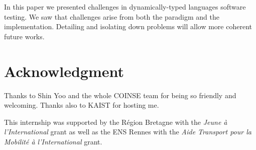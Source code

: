 \documentclass{llncs2e/llncs}
\begin{document}
In this paper we presented challenges in dynamically-typed languages software
testing. We saw that challenges arise from both the paradigm and the
implementation. Detailing and isolating down problems will allow more coherent
future works.


\section*{Acknowledgment}
Thanks to Shin Yoo and the whole COINSE team for being so friendly and
welcoming. Thanks also to KAIST for hosting me.

This internship was supported by the R\'egion Bretagne with the \textit{Jeune
\`a l'International} grant as well as the ENS Rennes with the \textit{Aide
Transport pour la Mobilit\'e \`a l'International} grant.



\end{document}
